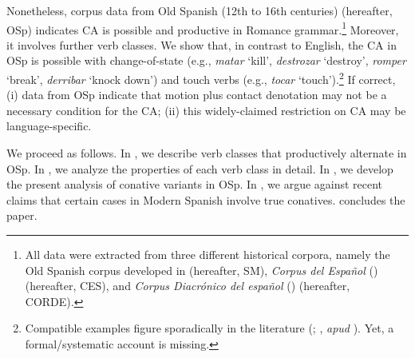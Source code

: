 \documentclass[output=paper,colorlinks,citecolor=brown,
]{langscibook}
\begin{document}

Nonetheless, corpus data from Old Spanish (12th to 16th centuries) (hereafter, OSp) indicates CA is possible and productive in Romance grammar.\footnote{All data were extracted from three different historical corpora, namely the Old Spanish corpus developed in \citet{Sanchez-Marcoetal2010} (hereafter, SM), \textit{Corpus del Español} (\citealt{Davies2002}) (hereafter, CES), and \textit{Corpus Diacrónico del español} (\citealt{Corde}) (hereafter, CORDE).} Moreover, it involves further verb classes. We show that, in contrast to English, the CA in OSp is possible with change-of-state (e.g., \textit{matar} ‘kill’, \textit{destrozar} ‘destroy’, \textit{romper} ‘break’, \textit{derribar} ‘knock down’) and touch verbs (e.g., \textit{tocar} ‘touch’).\footnote{Compatible examples figure sporadically in the literature (\citealt{Cano-Aguilar1977}; \citealt{Folgar1988}, \textit{apud} \citealt{Garcia-Miguel2006}). Yet, a formal/systematic account is missing.} If correct, (i) data from OSp indicate that motion plus contact denotation may not be a necessary condition for the CA; (ii) this widely-claimed restriction on CA may be language-specific.

We proceed as follows. In , we describe verb classes that productively alternate in OSp. In , we analyze the properties of each verb class in detail. In , we develop the present analysis of conative variants in OSp. In , we argue against recent claims that certain cases in Modern Spanish involve true conatives.  concludes the paper.
\end{document}
